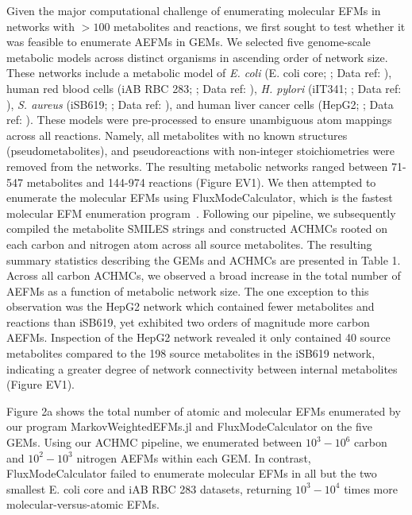 \documentclass[12pt]{article}
\begin{document}
Given the major computational challenge of enumerating molecular EFMs in
networks with $>100$ metabolites and reactions, we first sought to test
whether it was feasible to enumerate AEFMs in GEMs. We selected five
genome-scale metabolic models across distinct organisms in ascending order
of network size. These networks include a metabolic model of \textit{E.
coli} (E. coli core; \citealt{OrthJeffreyD2010RaUo}; Data ref:
\citealt{OrthJeffreyD2010RaUoDATASET}), human red blood cells (iAB RBC
283; \citealt{BordbarAarash2011iApd}; Data ref:
\citealt{BordbarAarash2011iApdDATASET}), \textit{H. pylori} (iIT341;
\citealt{ThieleInes2005EMRo}; Data ref:
\citealt{ThieleInes2005EMRoDATASET}), \textit{S. aureus} (iSB619;
\citealt{BeckerScottA2005Grot}; Data ref:
\citealt{BeckerScottA2005GrotDATASET}), and human liver cancer cells
(HepG2; \citealt{NilssonAvlant2020Qaoa}; Data ref:
\citealt{NilssonAvlant2020QaoaDATASET}). These models were pre-processed
to ensure unambiguous atom mappings across all reactions. Namely, all
metabolites with no known structures (pseudometabolites), and
pseudoreactions with non-integer stoichiometries were removed from the
networks. The resulting metabolic networks ranged between 71-547
metabolites and 144-974 reactions (Figure EV1). We then attempted to
enumerate the molecular EFMs using FluxModeCalculator, which is the
fastest molecular EFM enumeration
program~\citep{vanKlinkenJanBert2016Faet}. Following our pipeline, we
subsequently compiled the metabolite SMILES strings and constructed ACHMCs
rooted on each carbon and nitrogen atom across all source metabolites. The
resulting summary statistics describing the GEMs and ACHMCs are presented
in Table 1. Across all carbon ACHMCs, we observed a broad increase in the
total number of AEFMs as a function of metabolic network size. The one
exception to this observation was the HepG2 network which contained fewer
metabolites and reactions than iSB619, yet exhibited two orders of
magnitude more carbon AEFMs. Inspection of the HepG2 network revealed it
only contained 40 source metabolites compared to the 198 source
metabolites in the iSB619 network, indicating a greater degree of network
connectivity between internal metabolites (Figure EV1).

Figure 2a shows the total number of atomic and molecular EFMs enumerated
by our program MarkovWeightedEFMs.jl and FluxModeCalculator on the five
GEMs. Using our ACHMC pipeline, we enumerated between $10^3 - 10^6$ carbon
and $10^2-10^3$ nitrogen AEFMs within each GEM. In contrast, FluxModeCalculator
failed to enumerate molecular EFMs in all but the two smallest E. coli
core and iAB RBC 283 datasets, returning $10^3 - 10^4$ times more
molecular-versus-atomic EFMs. 
\end{document}
